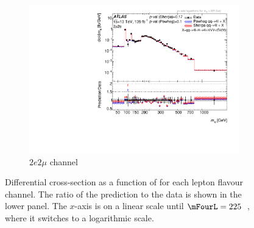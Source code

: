 \begin{figure}[H]
\begin{subfigure}{.49\textwidth}
      \includegraphics[width=.95\linewidth]{Figures/m4l/UnfoldedResults/linlog_Unfolded_Data_m4l_event_type2mu2e.pdf}  \caption{$2e2\mu$ channel}\label{fig:sub-third}
    \end{subfigure}
    \caption{Differential cross-section as a function of \mFourL{} for each lepton flavour channel. \errorbars{} \SMpredictions{} \Pvalue{} The ratio of the \SHERPA{} prediction to the data is shown in the lower panel. The $x$-axis is on a linear scale until $\mFourL = 225$~\GeV, where it switches to a logarithmic scale.}
    \label{fig:m4l_flavour}
\end{figure}

